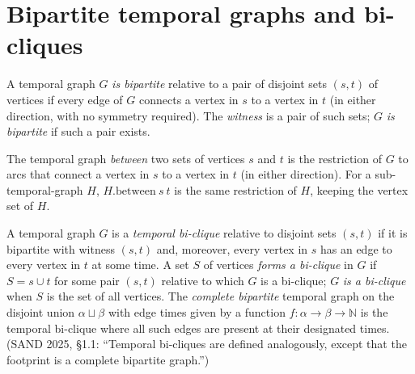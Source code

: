 \section{Bipartite temporal graphs and bi-cliques}
\label{sec:bipartite}

\begin{definition}[Bipartiteness]
  \label{def:is-bipartite}
  \leanok
  A temporal graph $G$ \emph{is bipartite} relative to a pair of disjoint sets
  $(s, t)$ of vertices if every edge of $G$ connects a vertex in $s$ to a
  vertex in $t$ (in either direction, with no symmetry required). The
  \emph{witness} is a pair of such sets; $G$ \emph{is bipartite} if such a
  pair exists.
\end{definition}

\begin{definition}
  \label{def:between}
  \leanok
  The temporal graph \emph{between} two sets of vertices $s$ and $t$ is the
  restriction of $G$ to arcs that connect a vertex in $s$ to a vertex in $t$
  (in either direction). For a sub-temporal-graph $H$, $H.\mathrm{between}\ s\ t$
  is the same restriction of $H$, keeping the vertex set of $H$.
\end{definition}

\begin{definition}
  \label{def:is-biclique}
  \leanok
  A temporal graph $G$ is a \emph{temporal bi-clique} relative to disjoint sets
  $(s, t)$ if it is bipartite with witness $(s, t)$ and, moreover, every vertex
  in $s$ has an edge to every vertex in $t$ at some time. A set $S$ of vertices
  \emph{forms a bi-clique} in $G$ if $S = s \cup t$ for some pair $(s, t)$
  relative to which $G$ is a bi-clique; $G$ \emph{is a bi-clique} when $S$ is
  the set of all vertices. The
  \emph{complete bipartite} temporal graph on the disjoint union $\alpha \sqcup
  \beta$ with edge times given by a function $f : \alpha \to \beta \to
  \mathbb{N}$ is the temporal bi-clique where all such edges are present at
  their designated times. (SAND 2025, \S1.1: ``Temporal bi-cliques are defined
  analogously, except that the footprint is a complete bipartite graph.'')
\end{definition}

